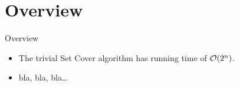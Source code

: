 \section{Overview}
\label{section1}
\begin{frame}{Overview}
\begin{itemize}[<+->]
 \item The trivial Set Cover algorithm has running time of ${\cal O}(2^n)$.
 \item bla, bla, bla\ldots
\end{itemize}

\end{frame}
